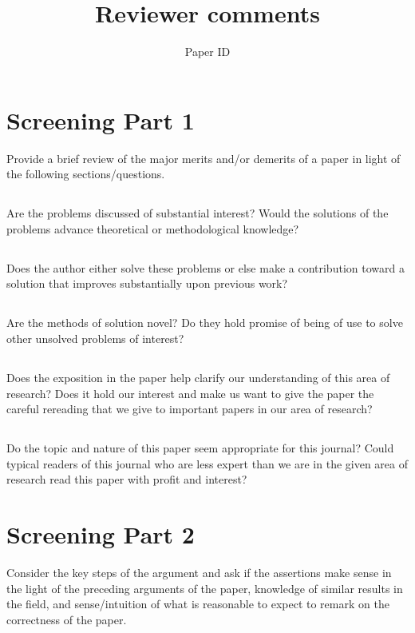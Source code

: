 \documentclass[11pt]{article}
\theoremstyle{plain}
\theoremstyle{definition}
\begin{document}
\title{Reviewer comments}
\author{Paper ID}
\maketitle




\section{Screening Part 1} 
Provide a brief review of the major merits and/or demerits of a paper in light of the following sections/questions. 
\subsection{} Are the problems discussed of substantial interest? Would the solutions of the problems advance theoretical or methodological knowledge? 

\subsection{} Does the author either solve these problems or else make a contribution toward a solution that improves substantially upon previous work? 

\subsection{} Are the methods of solution novel? Do they hold promise of being of use to solve other unsolved problems of interest? 

\subsection{} Does the exposition in the paper help clarify our understanding of this area of research? Does it hold our interest and make us want to give the paper the careful rereading that we give to important papers in our area of research? 

\subsection{} Do the topic and nature of this paper seem appropriate for this journal? Could typical readers of this journal who are less expert than we are in the given area of research read this paper with profit and interest? 

\section{Screening Part 2} 
Consider the key steps of the argument and ask if the assertions make sense in the light of the preceding arguments of the paper, knowledge of similar results in the field, and sense/intuition of what is reasonable to expect to remark on the correctness of the paper. 
\end{document}
